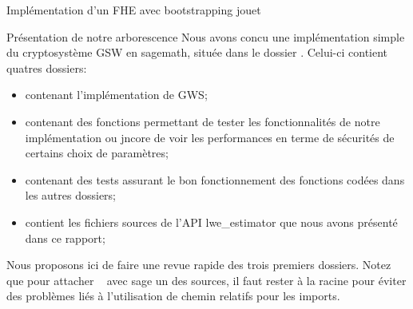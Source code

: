 \begin{section}{Implémentation d'un FHE avec bootstrapping \og{} jouet\fg~{}}
\begin{subsection}{Présentation de notre arborescence}
Nous avons concu une implémentation simple 
du cryptosystème GSW en sagemath, située dans le dossier
. Celui-ci contient quatres dossiers:
\begin{itemize}
\item {} contenant l'implémentation de GWS;
\item {} contenant des fonctions permettant 
	de tester les fonctionnalités de notre implémentation 
	ou jncore de voir les performances 
	en terme de sécurités de certains choix de paramètres;
\item {} contenant des tests assurant le bon fonctionnement
	des fonctions codées dans les autres dossiers; 
\item {} contient les fichiers sources de l'API
	lwe\_estimator que nous avons présenté dans ce rapport; 
\end{itemize}

Nous proposons ici de faire une revue rapide des trois premiers dossiers. Notez que pour
\og attacher \fg~ avec sage un des sources, il faut rester à la racine pour
éviter des problèmes liés à l'utilisation de chemin relatifs pour les imports.



\end{subsection}
\end{section}
